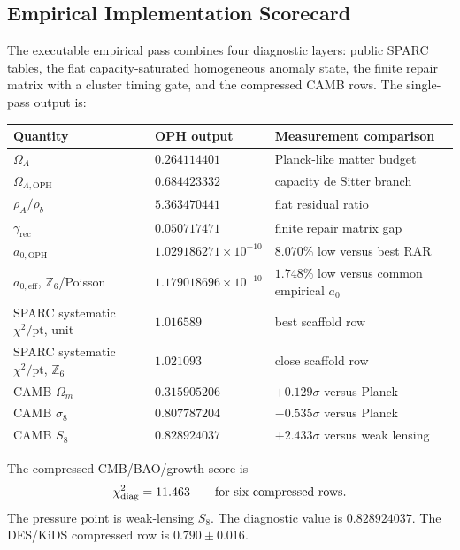 \documentclass[11pt]{article}
\newcommand{\OPH}{\mathrm{OPH}}
\newcommand{\aoph}{a_{0,\mathrm{OPH}}}
\newcommand{\aeff}{a_{0,\mathrm{eff}}}
\newcommand{\Zsix}{\mathbb Z_6}
\begin{document}
\subsection{Empirical Implementation Scorecard}

The executable empirical pass combines four diagnostic layers: public SPARC
tables, the flat capacity-saturated homogeneous anomaly state, the finite
repair matrix with a cluster timing gate, and the compressed CAMB rows.  The
single-pass output is:
\begin{center}
\small
\begin{tabularx}{\textwidth}{@{}p{}p{}X@{}}
\toprule
Quantity & OPH output & Measurement comparison \\
\midrule
\(\Omega_A\) & \(0.264114401\) & Planck-like matter budget \\
\(\Omega_{\Lambda,\OPH}\) & \(0.684423332\) & capacity de Sitter branch \\
\(\rho_A/\rho_b\) & \(5.363470441\) & flat residual ratio \\
\(\gamma_{\mathrm{rec}}\) & \(0.050717471\) & finite repair matrix gap \\
\(\aoph\) & \(1.029186271\times10^{-10}\) & \(8.070\%\) low versus best RAR \\
\(\aeff\), \(\Zsix\)/Poisson & \(1.179018696\times10^{-10}\) & \(1.748\%\) low versus common empirical \(a_0\) \\
SPARC systematic \(\chi^2/\mathrm{pt}\), unit & \(1.016589\) & best scaffold row \\
SPARC systematic \(\chi^2/\mathrm{pt}\), \(\Zsix\) & \(1.021093\) & close scaffold row \\
CAMB \(\Omega_m\) & \(0.315905206\) & \(+0.129\sigma\) versus Planck \\
CAMB \(\sigma_8\) & \(0.807787204\) & \(-0.535\sigma\) versus Planck \\
CAMB \(S_8\) & \(0.828924037\) & \(+2.433\sigma\) versus weak lensing \\
\bottomrule
\end{tabularx}
\end{center}

The compressed CMB/BAO/growth score is
\[
  \chi^2_{\mathrm{diag}}=11.463
  \qquad \hbox{for six compressed rows.}
\]
The pressure point is weak-lensing \(S_8\).  The diagnostic value is
\(0.828924037\).  The DES/KiDS compressed row is \(0.790\pm0.016\).
\end{document}
